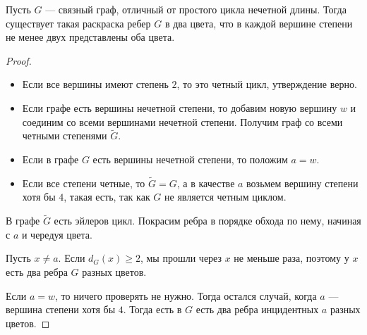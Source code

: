 \begin{lemma}\label{lm:coloring_10}
	Пусть $G$ --- связный граф, отличный от простого цикла нечетной длины. Тогда существует такая раскраска ребер $G$ в два цвета, что в каждой вершине степени не менее двух представлены оба цвета.
\end{lemma}
\begin{proof}
	\begin{itemize}
		\item Если все вершины имеют степень $2$, то это четный цикл, утверждение верно.
		\item Если  графе есть вершины нечетной степени, то добавим новую вершину $w$ и соединим со всеми вершинами нечетной степени. Получим граф со всеми четными степенями $\tilde{G}$.
		\item Если в графе $G$ есть вершины нечетной степени, то положим $a = w$.
		\item Если  все степени четные, то $\tilde{G} = G$, а в качестве  $a$ возьмем вершину степени хотя бы $4$, такая есть, так как $G$ не является четным циклом.
	\end{itemize}
	В графе $\tilde{G}$ есть эйлеров цикл. Покрасим ребра в порядке обхода по нему, начиная с $a$ и чередуя цвета.

	Пусть $x \neq a$. Если $d_G(x) \ge 2$, мы прошли через $x$ не меньше раза, поэтому у $x$ есть два ребра $G$ разных цветов. 

	Если $a = w$, то ничего проверять не нужно. Тогда остался случай, когда $a$ --- вершина степени хотя бы $4$. Тогда есть в $G$ есть два ребра инцидентных $a$ разных цветов.
\end{proof}

